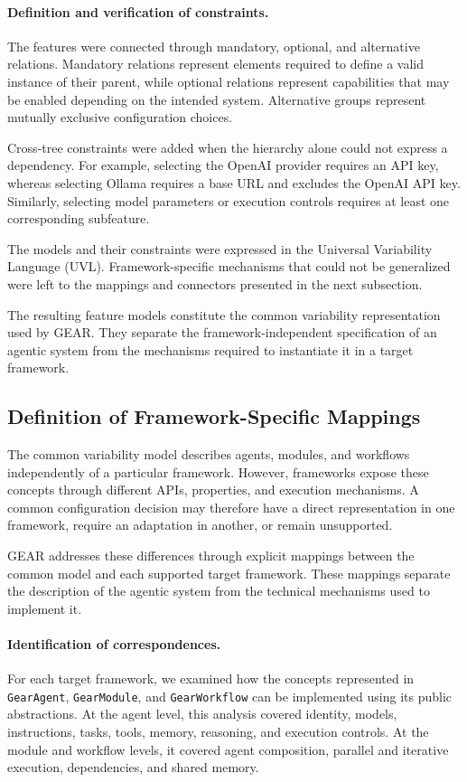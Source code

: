 \paragraph{\textbf{Definition and verification of constraints.}}
The features were connected through mandatory, optional, and alternative
relations. Mandatory relations represent elements required to define a valid
instance of their parent, while optional relations represent capabilities that
may be enabled depending on the intended system. Alternative groups represent
mutually exclusive configuration choices.

Cross-tree constraints were added when the hierarchy alone could not express a
dependency. For example, selecting the OpenAI provider requires an API key,
whereas selecting Ollama requires a base URL and excludes the OpenAI API key.
Similarly, selecting model parameters or execution controls requires at least
one corresponding subfeature.

The models and their constraints were expressed in the Universal Variability
Language (UVL). Framework-specific mechanisms that could not be generalized
were left to the mappings and connectors presented in the next subsection.

The resulting feature models constitute the common variability representation
used by GEAR. They separate the framework-independent specification of an
agentic system from the mechanisms required to instantiate it in a target
framework.

\subsection{Definition of Framework-Specific Mappings}
\label{subsec:mapping-target-frameworks}

The common variability model describes agents, modules, and workflows
independently of a particular framework. However, frameworks expose these
concepts through different APIs, properties, and execution mechanisms. A common
configuration decision may therefore have a direct representation in one
framework, require an adaptation in another, or remain unsupported.

GEAR addresses these differences through explicit mappings between the common
model and each supported target framework. These mappings separate the
description of the agentic system from the technical mechanisms used to
implement it.


\paragraph{\textbf{Identification of correspondences.}}
For each target framework, we examined how the concepts represented in
\texttt{GearAgent}, \texttt{GearModule}, and \texttt{GearWorkflow} can be
implemented using its public abstractions. At the agent level, this analysis
covered identity, models, instructions, tasks, tools, memory, reasoning, and
execution controls. At the module and workflow levels, it covered agent
composition, parallel and iterative execution, dependencies, and shared memory.

